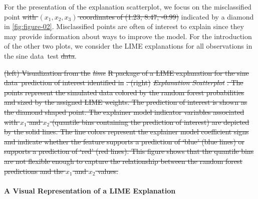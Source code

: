\documentclass[AMS,STIX2COL]{WileyNJD-v2}\usepackage[]{graphicx}\usepackage[]{color}
\newenvironment{knitrout}{}{} %
\newcommand{\data}{sine data}
\providecommand{\DIFadd}[1]{{\protect\color{blue}\uwave{#1}}} %
\providecommand{\DIFdel}[1]{{\protect\color{red}\sout{#1}}}                      %
\providecommand{\DIFaddbegin}{} %
\providecommand{\DIFaddend}{} %
\providecommand{\DIFdelbegin}{} %
\providecommand{\DIFdelend}{} %
\providecommand{\DIFdelFL}[1]{\DIFdel{#1}} %
\newcommand{\DIFscaledelfig}{0.5}
\newlength{\DIFdelgraphicswidth} %
\newlength{\DIFdelgraphicsheight} %
\newcommand{\DIFaddincludegraphics}[2][]{{\color{blue}\fbox{\DIFOincludegraphics[#1]{#2}}}} %
\newcommand{\DIFdelincludegraphics}[2][]{%
\sbox{\DIFdelgraphicsbox}{\DIFOincludegraphics[#1]{#2}}%
\settoboxwidth{\DIFdelgraphicswidth}{\DIFdelgraphicsbox} %
\settoboxtotalheight{\DIFdelgraphicsheight}{\DIFdelgraphicsbox} %
\scalebox{\DIFscaledelfig}{%
\parbox[b]{\DIFdelgraphicswidth}{\usebox{\DIFdelgraphicsbox}\\[-\baselineskip] \rule{\DIFdelgraphicswidth}{0em}}\llap{\resizebox{\DIFdelgraphicswidth}{\DIFdelgraphicsheight}{%
\setlength{\unitlength}{\DIFdelgraphicswidth}%
\begin{picture}(1,1)%
\thicklines\linethickness{2pt} %
{\color[rgb]{1,0,0}\put(0,0){\framebox(1,1){}}}%
{\color[rgb]{1,0,0}\put(0,0){\line( 1,1){1}}}%
{\color[rgb]{1,0,0}\put(0,1){\line(1,-1){1}}}%
\end{picture}%
}\hspace*{3pt}}} %
} %
\DeclareRobustCommand{\DIFaddbegin}{\DIFOaddbegin \let\includegraphics\DIFaddincludegraphics} %
\DeclareRobustCommand{\DIFaddend}{\DIFOaddend \let\includegraphics\DIFOincludegraphics} %
\DeclareRobustCommand{\DIFdelbegin}{\DIFOdelbegin \let\includegraphics\DIFdelincludegraphics} %
\DeclareRobustCommand{\DIFdelend}{\DIFOaddend \let\includegraphics\DIFOincludegraphics} %
\begin{document}
For the presentation of the explanation scatterplot, we focus on the misclassified point \DIFdelbegin \DIFdel{with $(x_1, x_2, x_3)$ coordinates of (1.23, 8.47, -0.99) }\DIFdelend indicated by a diamond in \DIFdelbegin %
\DIFdelend \DIFaddbegin \autoref{fig:figure-02}\DIFaddend . Misclassified points are often of interest to explain since they may provide information about ways to improve the model. For the introduction of the other two plots, we consider the LIME explanations for all observations in the \data \ test \DIFdelbegin \DIFdel{data}\DIFdelend \DIFaddbegin \DIFadd{set}\DIFaddend .

\DIFdelbegin %



{%
\DIFdelFL{(left) Visualization from the }\emph{\DIFdelFL{lime}} %
\DIFdelFL{R package of a LIME explanation for the \data \ prediction of interest identified in }%
\DIFdelFL{. (right) }\emph{\DIFdelFL{Explanation Scatterplot}}%
\DIFdelFL{. The points represent the simulated data colored by the random forest probabilities and sized by the assigned LIME weights. The prediction of interest is shown as the diamond shaped point. The explainer model indicator variables associated with $x_1$ and $x_2$ (quantile bins containing the prediction of interest) are depicted by the solid lines. The line colors represent the explainer model coefficient signs and indicate whether the feature supports a prediction of `blue' (blue lines) or supports a prediction of `red' (red lines). This figure shows that the quantile bins are not flexible enough to capture the relationship between the random forest predictions and the $x_1$ and $x_2$ values.}}

\DIFdelend \paragraph{A Visual Representation of a LIME Explanation}
\end{document}
